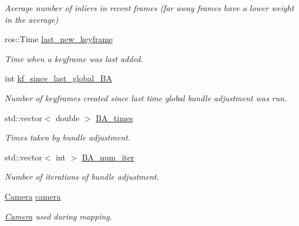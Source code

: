 \begin{DoxyCompactItemize}
\begin{DoxyCompactList}\small\item\em Average number of inliers in recent frames (far away frames have a lower weight in the average) \end{DoxyCompactList}\item 
\mbox{\label{classMap_aa0395513a7ef43438f5ee965e3b9f2dd}} 
ros\+::\+Time \hyperlink{classMap_aa0395513a7ef43438f5ee965e3b9f2dd}{last\+\_\+new\+\_\+keyframe}
\begin{DoxyCompactList}\small\item\em Time when a keyframe was last added. \end{DoxyCompactList}\item 
\mbox{\label{classMap_ac029a5c3bdc1a95c39519a30c2435670}} 
int \hyperlink{classMap_ac029a5c3bdc1a95c39519a30c2435670}{kf\+\_\+since\+\_\+last\+\_\+global\+\_\+\+BA}
\begin{DoxyCompactList}\small\item\em Number of keyframes created since last time global bundle adjustment was run. \end{DoxyCompactList}\item 
\mbox{\label{classMap_a7183a0cc5d16367c2248eb7db0e6839a}} 
std\+::vector$<$ double $>$ \hyperlink{classMap_a7183a0cc5d16367c2248eb7db0e6839a}{B\+A\+\_\+times}
\begin{DoxyCompactList}\small\item\em Times taken by bundle adjustment. \end{DoxyCompactList}\item 
\mbox{\label{classMap_a5d91c796d77673ab8751fe0549ee36aa}} 
std\+::vector$<$ int $>$ \hyperlink{classMap_a5d91c796d77673ab8751fe0549ee36aa}{B\+A\+\_\+num\+\_\+iter}
\begin{DoxyCompactList}\small\item\em Number of iterations of bundle adjustment. \end{DoxyCompactList}\item 
\mbox{\label{classMap_ad3aacc2f037e8c13212129d34d0e161f}} 
\hyperlink{structCamera}{Camera} \hyperlink{classMap_ad3aacc2f037e8c13212129d34d0e161f}{camera}
\begin{DoxyCompactList}\small\item\em \hyperlink{structCamera}{Camera} used during mapping. \end{DoxyCompactList}\item 

\end{DoxyCompactItemize}
